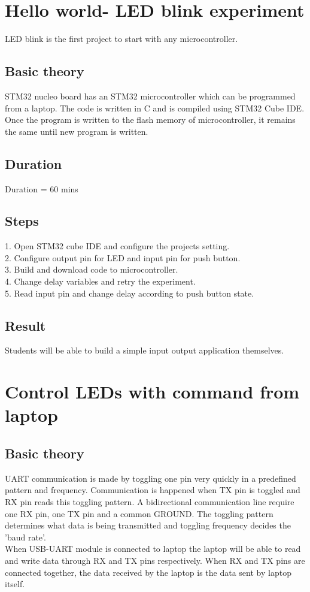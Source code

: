 \documentclass[11pt]{article}
\begin{document}
\section{Hello world- LED blink experiment}
LED blink is the first project to start with any microcontroller. 
\subsection{Basic theory}
STM32 nucleo board has an STM32 microcontroller which can be programmed from a laptop. The code is written in C and is compiled using STM32 Cube IDE. Once the program is written to the flash memory of microcontroller, it remains the same until new program is written. 
\subsection{Duration}
Duration = 60 mins
\subsection{Steps}
1. Open STM32 cube IDE and configure the projects setting.\\
2. Configure output pin for LED and  input pin for push button.\\
3. Build and download code to microcontroller.\\
4. Change delay variables and retry the experiment.\\
5. Read input pin and change delay according to push button state.\\
\subsection{Result}
Students will be able to build a simple input output application themselves.

\section{Control LEDs with command from laptop}
\subsection{Basic theory}
UART communication is made by toggling one pin very quickly in a predefined pattern and frequency. Communication is happened when TX pin is toggled and RX pin reads this toggling pattern. A bidirectional communication line require one RX pin, one TX pin and a common GROUND. The toggling pattern determines what data is being transmitted and toggling frequency decides the 'baud rate'.\\
When USB-UART module is connected to laptop the laptop will be able to read and write data through RX and TX pins respectively. When RX and TX pins are connected together, the data received by the laptop is the data sent by laptop itself.
\end{document}
